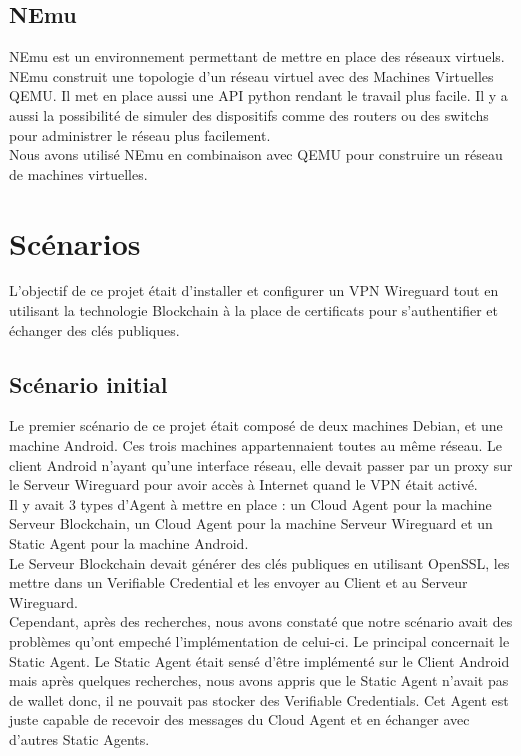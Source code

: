 \documentclass[12pt, openany]{report}
\begin{document}
\subsection{NEmu}
\noindent 
\begin{flushleft}
NEmu est un environnement permettant de mettre en place des réseaux virtuels. NEmu construit une topologie d'un réseau virtuel avec des Machines Virtuelles QEMU. Il met en place aussi une API python rendant le travail plus facile. Il y a aussi la possibilité de simuler des dispositifs comme des routers ou des switchs pour administrer le réseau plus facilement. \\
Nous avons utilisé NEmu en combinaison avec QEMU pour construire un réseau de machines virtuelles.
\end{flushleft}

\section{Scénarios}
L'objectif de ce projet était d'installer et configurer un VPN Wireguard tout en utilisant la technologie Blockchain à la place de certificats pour s'authentifier et échanger des clés publiques. 

\subsection{Scénario initial}
\noindent 
\begin{flushleft}
Le premier scénario de ce projet était composé de deux machines Debian, et une machine Android. Ces trois machines appartennaient toutes au même réseau. Le client Android n'ayant qu'une interface réseau, elle devait passer par un proxy sur le Serveur Wireguard pour avoir accès à Internet quand le VPN était activé. \\
\vspace{2mm}
Il y avait 3 types d'Agent à mettre en place : un Cloud Agent pour la machine Serveur Blockchain, un Cloud Agent pour la machine Serveur Wireguard et un Static Agent pour la machine Android. \\
Le Serveur Blockchain devait générer des clés publiques en utilisant OpenSSL, les mettre dans un Verifiable Credential et les envoyer au Client et au Serveur Wireguard. \\
Cependant, après des recherches, nous avons constaté que notre scénario avait des problèmes qu'ont empeché l'implémentation de celui-ci. Le principal concernait le Static Agent. Le Static Agent était sensé d'être implémenté sur le Client Android mais après quelques recherches, nous avons appris que le Static Agent n'avait pas de wallet donc, il ne pouvait pas stocker des Verifiable Credentials. Cet Agent est juste capable de recevoir des messages du Cloud Agent et en échanger avec d'autres Static Agents. 
\end{flushleft}
\end{document}
